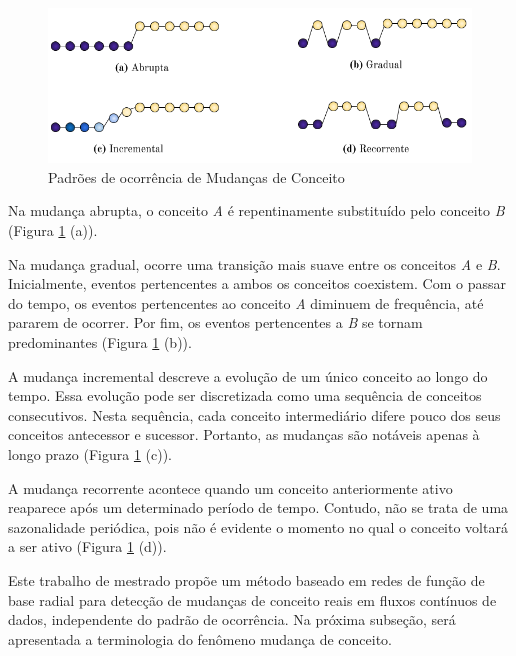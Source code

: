 \documentclass[qual, classic, a4paper]{ufbathesis}
\begin{document}
\begin{figure}[H]
\begin{center}
    \includegraphics[scale=0.8]{imagens/concept_drift_patterns.png}
    \caption{Padrões de ocorrência de Mudanças de Conceito}
    \label{fig:concept_drift_patterns}
\end{center}
\end{figure}

Na mudança abrupta, o conceito \textit{A} é repentinamente substituído pelo conceito \textit{B} (Figura \ref{fig:concept_drift_patterns} (a)).

Na mudança gradual, ocorre uma transição mais suave entre os conceitos \textit{A} e \textit{B}.
Inicialmente, eventos pertencentes a ambos os conceitos coexistem.
Com o passar do tempo, os eventos pertencentes ao conceito \textit{A} diminuem de frequência, até pararem de ocorrer.
Por fim, os eventos pertencentes a \textit{B} se tornam predominantes (Figura \ref{fig:concept_drift_patterns} (b)).

A mudança incremental descreve a evolução de um único conceito ao longo do tempo.
Essa evolução pode ser discretizada como uma sequência de conceitos consecutivos.
Nesta sequência, cada conceito intermediário difere pouco dos seus conceitos antecessor e sucessor.
Portanto, as mudanças são notáveis apenas à longo prazo (Figura \ref{fig:concept_drift_patterns} (c)).

A mudança recorrente acontece quando um conceito anteriormente ativo reaparece após um determinado período de tempo. 
Contudo, não se trata de uma sazonalidade periódica, pois não é evidente o momento no qual o conceito voltará a ser ativo (Figura \ref{fig:concept_drift_patterns} (d)).

Este trabalho de mestrado propõe um método baseado em redes de função de base radial para detecção de mudanças de conceito reais em fluxos contínuos de dados, independente do padrão de ocorrência.
Na próxima subseção, será apresentada a terminologia do fenômeno mudança de conceito.
\end{document}
